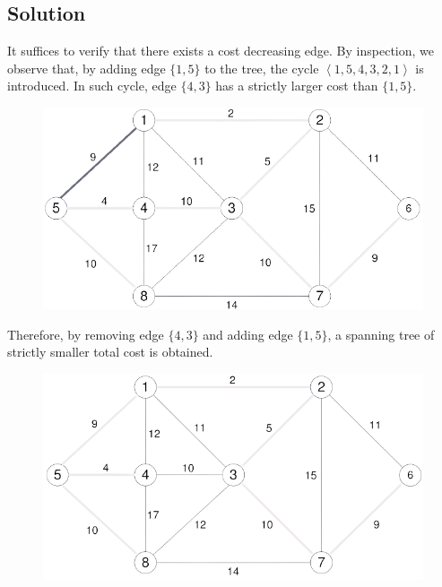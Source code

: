 \documentclass[12pt, a4paper]{report}
\begin{document}
    \subsection*{Solution}
        It suffices to verify that there exists a cost decreasing edge. By inspection, we observe that, by adding edge $\{1,5\}$ to the tree, the cycle 
        $\left\langle 1,5,4,3,2,1\right\rangle$ is introduced. In such cycle, edge $\{4,3\}$ has a strictly larger cost than $\{1,5\}$. 
        \begin{figure}[H]
            \centering
            \includegraphics[width=0.5\linewidth]{images/optimality1.png}
        \end{figure}
        Therefore, by removing edge $\{4,3\}$ and adding edge $\{1,5\}$, a spanning tree of strictly smaller total cost is obtained. 
        \begin{figure}[H]
            \centering
            \includegraphics[width=0.5\linewidth]{images/optimality2.png}
        \end{figure}

    \newpage
\end{document}
